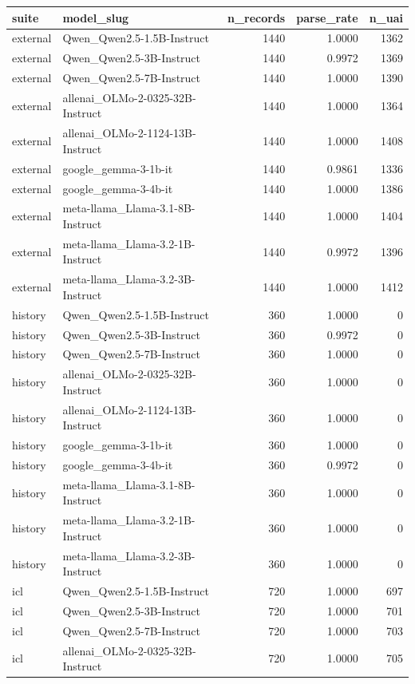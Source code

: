 \begin{tabular}{llrrr}
\toprule
suite & model_slug & n_records & parse_rate & n_uai \\
\midrule
external & Qwen_Qwen2.5-1.5B-Instruct & 1440 & 1.0000 & 1362 \\
external & Qwen_Qwen2.5-3B-Instruct & 1440 & 0.9972 & 1369 \\
external & Qwen_Qwen2.5-7B-Instruct & 1440 & 1.0000 & 1390 \\
external & allenai_OLMo-2-0325-32B-Instruct & 1440 & 1.0000 & 1364 \\
external & allenai_OLMo-2-1124-13B-Instruct & 1440 & 1.0000 & 1408 \\
external & google_gemma-3-1b-it & 1440 & 0.9861 & 1336 \\
external & google_gemma-3-4b-it & 1440 & 1.0000 & 1386 \\
external & meta-llama_Llama-3.1-8B-Instruct & 1440 & 1.0000 & 1404 \\
external & meta-llama_Llama-3.2-1B-Instruct & 1440 & 0.9972 & 1396 \\
external & meta-llama_Llama-3.2-3B-Instruct & 1440 & 1.0000 & 1412 \\
history & Qwen_Qwen2.5-1.5B-Instruct & 360 & 1.0000 & 0 \\
history & Qwen_Qwen2.5-3B-Instruct & 360 & 0.9972 & 0 \\
history & Qwen_Qwen2.5-7B-Instruct & 360 & 1.0000 & 0 \\
history & allenai_OLMo-2-0325-32B-Instruct & 360 & 1.0000 & 0 \\
history & allenai_OLMo-2-1124-13B-Instruct & 360 & 1.0000 & 0 \\
history & google_gemma-3-1b-it & 360 & 1.0000 & 0 \\
history & google_gemma-3-4b-it & 360 & 0.9972 & 0 \\
history & meta-llama_Llama-3.1-8B-Instruct & 360 & 1.0000 & 0 \\
history & meta-llama_Llama-3.2-1B-Instruct & 360 & 1.0000 & 0 \\
history & meta-llama_Llama-3.2-3B-Instruct & 360 & 1.0000 & 0 \\
icl & Qwen_Qwen2.5-1.5B-Instruct & 720 & 1.0000 & 697 \\
icl & Qwen_Qwen2.5-3B-Instruct & 720 & 1.0000 & 701 \\
icl & Qwen_Qwen2.5-7B-Instruct & 720 & 1.0000 & 703 \\
icl & allenai_OLMo-2-0325-32B-Instruct & 720 & 1.0000 & 705 \\

\end{tabular}
